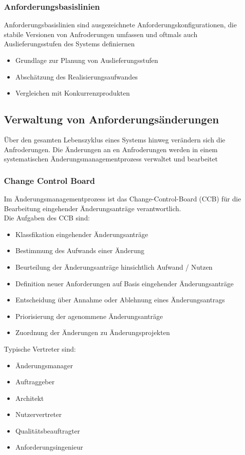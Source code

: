 \documentclass{report}
\theoremstyle{definition}
\theoremstyle{example}
\begin{document}
\subsubsection{Anforderungsbasislinien}
Anforderungsbasislinien sind ausgezeichnete Anforderungskonfigurationen, die stabile Versionen von Anfroderungen umfassen und oftmals auch Auslieferungsstufen des Systems definiernen
\begin{itemize}
   \item Grundlage zur Planung von Auslieferungsstufen
   \item Abschätzung des Realisierungsaufwandes
   \item Vergleichen mit Konkurrenzprodukten
\end{itemize}

\subsection{Verwaltung von Anforderungsänderungen}
Über den gesamten Lebenszyklus eines Systems hinweg verändern sich die Anfroderungen. Die Änderungen an en Anfroderungen werden in einem systematischen Änderungsmanagementprozess verwaltet und bearbeitet

\subsubsection{Change Control Board}
Im Änderungsmanagementprozess ist das Change-Control-Board (CCB) für die Bearbeitung eingehender Änderungsanträge verantwortlich. \\
Die Aufgaben des CCB sind:
\begin{itemize}
   \item Klassfikation eingehender Änderungsanträge
   \item Bestimmung des Aufwands einer Änderung
   \item Beurteilung der Änderungsanträge hinsichtlich Aufwand / Nutzen
   \item Definition neuer Anforderungen auf Basis eingehender Änderungsanträge
   \item Entscheidung über Annahme oder Ablehnung eines Änderungsantrags
   \item Priorisierung der agenommene Änderungsanträge
   \item Zuordnung der Änderungen zu Änderungsprojekten
\end{itemize}

Typische Vertreter sind:
\begin{itemize}
   \item Änderungsmanager 
   \item Auftraggeber
   \item Architekt
   \item Nutzervertreter
   \item Qualitätsbeauftragter
   \item Anforderungsingenieur
\end{itemize}
\end{document}
